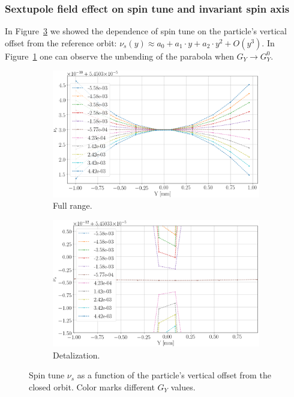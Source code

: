 \subsubsection{Sextupole field effect on spin tune and invariant spin axis}
In Figure~\ref{decoh:fig:ST_vs_y0_GSY} we showed the dependence of spin tune on the particle's
vertical offset from the reference orbit: $\nu_s(y) \approx a_0 + a_1\cdot y + a_2\cdot y^2 + O(y^3)$.
In Figure~\ref{decoh:fig:full:ST_vs_y0_GSY} one can observe the unbending of the parabola when
$G_Y \rightarrow G_Y^0$.
\begin{figure}[h!]
	\centering
	\begin{subfigure}{\linewidth}
		\includegraphics[width=\linewidth]{images/decoh_sim/spin_tune_vs_offset}
		\caption{Full range.\label{decoh:fig:full:ST_vs_y0_GSY}}
	\end{subfigure}
	\begin{subfigure}{\linewidth}
		\includegraphics[width=\linewidth]{images/decoh_sim/spin_tune_vs_offset_zoom}
		\caption{Detalization.\label{decoh:fig:zoom:ST_vs_y0_GSY}}
	\end{subfigure}
	\caption{Spin tune $\nu_s$ as a function of the particle's vertical offset from the closed orbit.
          Color marks different $G_Y$ values.\label{decoh:fig:ST_vs_y0_GSY}}
\end{figure}

